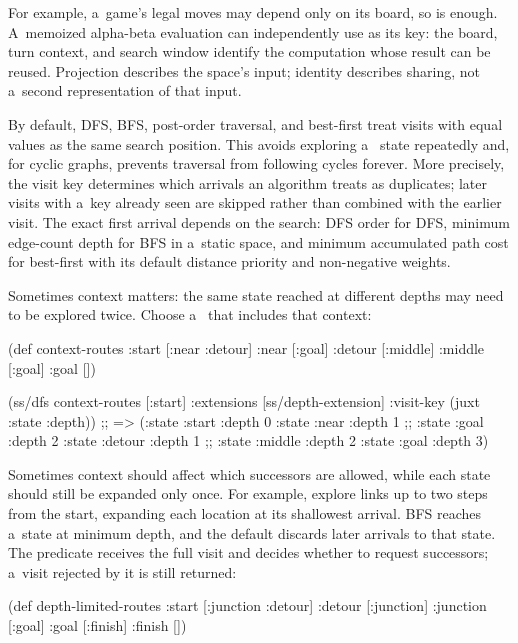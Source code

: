 For example, a~game's legal moves may depend only on its board, so
 is enough. A~memoized alpha-beta evaluation can
independently use  as its key:
the board, turn context, and search window identify the computation whose
result can be reused. Projection describes the space's input; identity
describes sharing, not a~second representation of that input.

By default, DFS, BFS, post-order traversal, and best-first treat visits with
equal  values as the same search position. This avoids exploring a~
state repeatedly and, for cyclic graphs, prevents traversal from following
cycles forever. More precisely, the visit key determines which arrivals an
algorithm treats as duplicates; later visits with a~key already seen are
skipped rather than combined with the earlier visit. The exact first arrival
depends on the search: DFS order for DFS, minimum edge-count depth for BFS in
a~static space, and minimum accumulated path cost for best-first with its
default distance priority and non-negative weights.

Sometimes context matters: the same state reached at different depths may
need to be explored twice. Choose a~ that includes that
context:

\begtt {}
(def context-routes {:start [:near :detour]
                     :near [:goal]
                     :detour [:middle]
                     :middle [:goal]
                     :goal []})

(ss/dfs context-routes [:start]
        {:extensions [ss/depth-extension]
         :visit-key (juxt :state :depth)})
;; => ({:state :start :depth 0} {:state :near :depth 1}
;;     {:state :goal :depth 2} {:state :detour :depth 1}
;;     {:state :middle :depth 2} {:state :goal :depth 3})
\endtt

Sometimes context should affect which successors are allowed, while each
state should still be expanded only once. For example, explore links up to
two steps from the start, expanding each location at its shallowest arrival.
BFS reaches a~state at minimum depth, and the default 
discards later arrivals to that state. The  predicate receives
the full visit and decides whether to request successors; a~visit rejected
by it is still returned:

\begtt {}
(def depth-limited-routes
  {:start [:junction :detour]
   :detour [:junction]
   :junction [:goal]
   :goal [:finish]
   :finish []})

